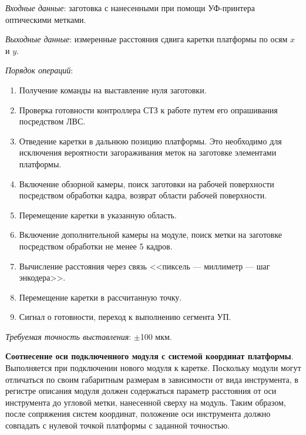 \textit{Входные данные}: заготовка с нанесенными при помощи УФ-принтера оптическими метками.

\textit{Выходные данные}: измеренные расстояния сдвига каретки платформы по осям $x$ и $y$.

\textit{Порядок операций}:

\begin{enumerate}
	\item Получение команды на выставление нуля заготовки.
	\item Проверка готовности контроллера СТЗ к работе путем его опрашивания посредством ЛВС.
	\item Отведение каретки в дальнюю позицию платформы. Это необходимо для исключения вероятности загораживания меток на заготовке элементами платформы.
	\item Включение обзорной камеры, поиск заготовки на рабочей поверхности посредством обработки кадра, возврат области рабочей поверхности.
	\item Перемещение каретки в указанную область. 
	\item Включение дополнительной камеры на модуле, поиск метки на заготовке посредством обработки не менее 5 кадров.
	\item Вычисление расстояния через связь <<пиксель --- миллиметр --- шаг энкодера>>.
	\item Перемещение каретки в рассчитанную точку.
	\item Сигнал о готовности, переход к выполнению сегмента УП.
\end{enumerate}

\textit{Требуемая точность выставления}: $\pm$100 мкм.

\textbf{Соотнесение оси подключенного модуля с системой координат платформы}. Выполняется при подключении нового модуля к каретке. Поскольку модули могут отличаться по своим габаритным размерам в зависимости от вида инструмента, в регистре описания модуля должен содержаться параметр расстояния от оси инструмента до угловой метки, нанесенной сверху на модуль. Таким образом, после сопряжения систем координат, положение оси инструмента должно совпадать с нулевой точкой платформы с заданной точностью.

